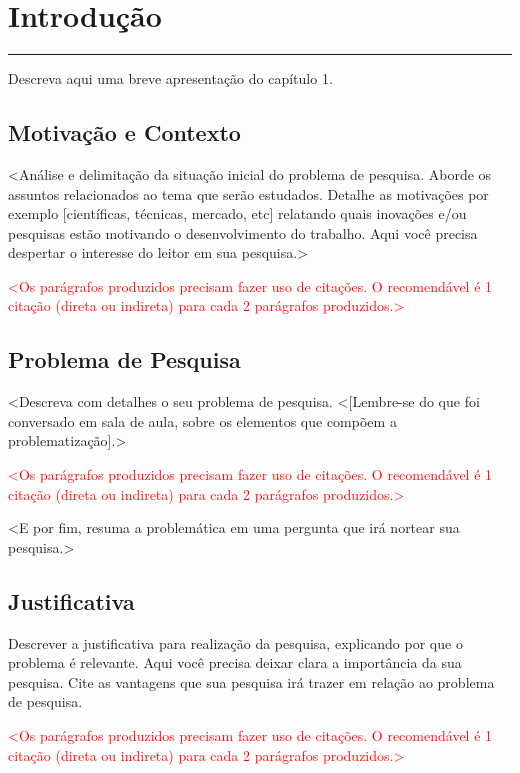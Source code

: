 \section{Introdução}

\vspace{-0.4cm}

\noindent\rule{\textwidth}{0.7pt}

Descreva aqui uma breve apresentação do capítulo 1.

\subsection{Motivação e Contexto}

<Análise e delimitação da situação inicial do problema de pesquisa. Aborde os assuntos relacionados ao tema que serão estudados. Detalhe as motivações por exemplo [científicas, técnicas, mercado, etc] relatando quais inovações e/ou pesquisas estão motivando o desenvolvimento do trabalho. Aqui você precisa despertar o interesse do leitor em sua pesquisa.>

\textcolor{red}{
<Os parágrafos produzidos precisam fazer uso de citações.
O recomendável é 1 citação (direta ou indireta)
para cada 2 parágrafos produzidos.>
}

\subsection{Problema de Pesquisa}

<Descreva com detalhes o seu problema de pesquisa.  <[Lembre-se do que foi conversado em sala de aula, sobre os elementos que compõem a problematização].>


\textcolor{red}{
<Os parágrafos produzidos precisam fazer uso de citações.
O recomendável é 1 citação (direta ou indireta)
para cada 2 parágrafos produzidos.>
}

<E por fim, resuma a problemática em uma pergunta
que irá nortear sua pesquisa.>

\subsection{Justificativa}

Descrever a justificativa para realização da pesquisa, explicando por que o problema é relevante. Aqui você precisa deixar clara a importância da sua pesquisa. Cite as vantagens que sua pesquisa irá trazer em relação ao problema de pesquisa.

\textcolor{red}{
<Os parágrafos produzidos precisam fazer uso de citações.
O recomendável é 1 citação (direta ou indireta)
para cada 2 parágrafos produzidos.> 
}

